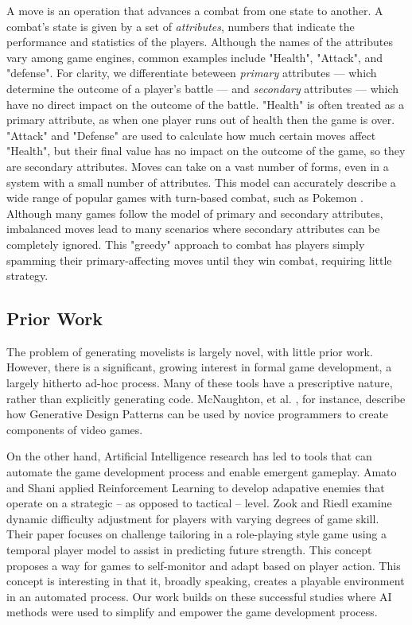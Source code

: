 \documentclass{acm_proc_article-sp}
\begin{document}
A move is an operation that advances a combat from one state to another. A combat's state is given by a set of \textit{attributes}, numbers that indicate the performance and statistics of the players. Although the names of the attributes vary among game engines, common examples include "Health", "Attack", and "defense". For clarity, we differentiate beteween \textit{primary} attributes --- which determine the outcome of a player's battle --- and \textit{secondary} attributes --- which have no direct impact on the outcome of the battle. "Health" is often treated as a primary attribute, as when one player runs out of health then the game is over. "Attack" and "Defense" are used to calculate how much certain moves affect "Health", but their final value has no impact on the outcome of the game, so they are secondary attributes. Moves can take on a vast number of forms, even in a system with a small number of attributes. This model can accurately describe a wide range of popular games with turn-based combat, such as Pokemon \cite{website:pokemon_calculations}. Although many games follow the model of primary and secondary attributes, imbalanced moves lead to many scenarios where secondary attributes can be completely ignored. This "greedy" approach to combat has players simply spamming their primary-affecting moves until they win combat, requiring little strategy.

\subsection{Prior Work}

The problem of generating movelists is largely novel, with little prior work. However, there is a significant, growing interest in formal game development, a largely hitherto ad-hoc process. Many of these tools have a prescriptive nature, rather than explicitly generating code. McNaughton, et al. \cite{generative_design_patterns}, for instance, describe how Generative Design Patterns can be used by novice programmers to create components of video games.

On the other hand, Artificial Intelligence research has led to tools that can automate the game development process and enable emergent gameplay. Amato and Shani\cite{reinforcement_strategy} applied Reinforcement Learning to develop adapative enemies that operate on a strategic -- as opposed to tactical -- level. Zook and Riedl \cite{dynamic_difficulty} examine dynamic difficulty adjustment for players with varying degrees of game skill. Their paper focuses on challenge tailoring in a role-playing style game using a temporal player model to assist in predicting future strength. This concept proposes a way for games to self-monitor and adapt based on player action. This concept is interesting in that it, broadly speaking, creates a playable environment in an automated process. Our work builds on these successful studies where AI methods were used to simplify and empower the game development process.
\end{document}
